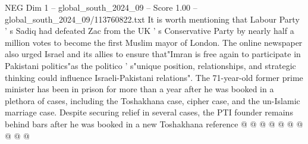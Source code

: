 \begin{textsample}{NEG Dim 1 – global\_south\_2024\_09 – Score 1.00 – global\_south\_2024\_09/113760822.txt}
It is worth mentioning that Labour Party ' s Sadiq had defeated Zac from the UK ' s Conservative Party by nearly half a million votes to become the first Muslim mayor of London.
The online newspaper also urged Israel and its allies to ensure that"Imran is free again to participate in Pakistani politics"as the politico ' s"unique position, relationships, and strategic thinking could influence Israeli-Pakistani relations".
The 71-year-old former prime minister has been in prison for more than a year after he was booked in a plethora of cases, including the Toshakhana case, cipher case, and the un-Islamic marriage case.
Despite securing relief in several cases, the PTI founder remains behind bars after he was booked in a new Toshakhana reference @ @ @ @ @ @ @ @ @ @

\end{textsample}
